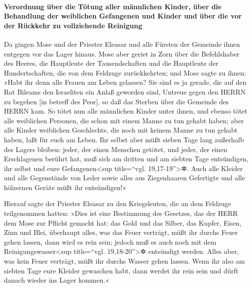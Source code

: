 \hypertarget{verordnung-uxfcber-die-tuxf6tung-aller-muxe4nnlichen-kinder-uxfcber-die-behandlung-der-weiblichen-gefangenen-und-kinder-und-uxfcber-die-vor-der-ruxfcckkehr-zu-vollziehende-reinigung}{%
\paragraph{Verordnung über die Tötung aller männlichen Kinder, über die
Behandlung der weiblichen Gefangenen und Kinder und über die vor der
Rückkehr zu vollziehende
Reinigung}\label{verordnung-uxfcber-die-tuxf6tung-aller-muxe4nnlichen-kinder-uxfcber-die-behandlung-der-weiblichen-gefangenen-und-kinder-und-uxfcber-die-vor-der-ruxfcckkehr-zu-vollziehende-reinigung}}

Da gingen Mose und der Priester Eleasar und alle Fürsten
der Gemeinde ihnen entgegen vor das Lager hinaus. Mose
aber geriet in Zorn über die Befehlshaber des Heeres, die Hauptleute der
Tausendschaften und die Hauptleute der Hundertschaften, die von dem
Feldzuge zurückkehrten; und Mose sagte zu ihnen: »Habt
ihr denn alle Frauen am Leben gelassen? Sie sind es ja
gerade, die auf den Rat Bileams den Israeliten ein Anlaß geworden sind,
Untreue gegen den HERRN zu begehen {[}in betreff des Peor{]}, so daß das
Sterben über die Gemeinde des HERRN kam. So tötet nun
alle männlichen Kinder unter ihnen, und ebenso tötet alle weiblichen
Personen, die schon mit einem Manne zu tun gehabt haben;
aber alle Kinder weiblichen Geschlechts, die noch mit
keinem Manne zu tun gehabt haben, laßt für euch am Leben.
Ihr selbst aber müßt sieben Tage lang außerhalb des
Lagers bleiben: jeder, der einen Menschen getötet, und jeder, der einen
Erschlagenen berührt hat, muß sich am dritten und am siebten Tage
entsündigen, ihr selbst und eure Gefangenen\textless sup title=``vgl.
19,17-19''\textgreater✲. Auch alle Kleider und alle
Gegenstände von Leder sowie alles aus Ziegenhaaren Gefertigte und alle
hölzernen Geräte müßt ihr entsündigen!«

Hierauf sagte der Priester Eleasar zu den Kriegsleuten,
die an dem Feldzuge teilgenommen hatten: »Dies ist eine Bestimmung des
Gesetzes, das der HERR dem Mose zur Pflicht gemacht hat:
das Gold und das Silber, das Kupfer, Eisen, Zinn und
Blei, überhaupt alles, was das Feuer verträgt, müßt ihr
durchs Feuer gehen lassen, dann wird es rein sein; jedoch muß es auch
noch mit dem Reinigungswasser\textless sup title=``vgl.
19,18-20''\textgreater✲ entsündigt werden. Alles aber, was kein Feuer
verträgt, müßt ihr durchs Wasser gehen lassen. Wenn ihr
also am siebten Tage eure Kleider gewaschen habt, dann werdet ihr rein
sein und dürft danach wieder ins Lager kommen.«

